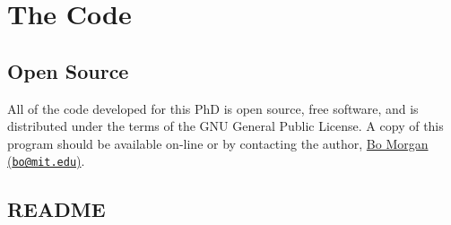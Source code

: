 \chapter{The Code}\label{appendix:the_code}

\section{Open Source}

All of the code developed for this PhD is open source, free software,
and is distributed under the terms of the GNU General Public License.
A copy of this program should be available on-line or by contacting
the author, \href{mailto:bo@mit.edu}{Bo Morgan
  (\nolinkurl{bo@mit.edu})}.

\section{README}

